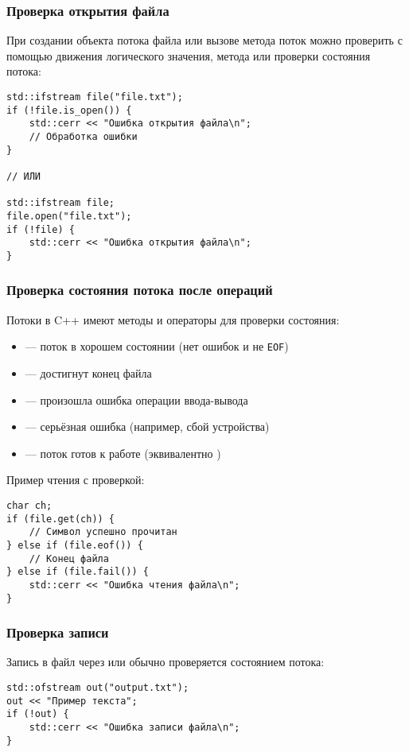 \subsubsection{Проверка открытия файла}
При создании объекта потока файла или вызове метода  поток можно проверить с помощью движения логического
значения, метода  или проверки состояния потока:
\begin{verbatim}
std::ifstream file("file.txt");
if (!file.is_open()) {
    std::cerr << "Ошибка открытия файла\n";
    // Обработка ошибки
}

// ИЛИ

std::ifstream file;
file.open("file.txt");
if (!file) {
    std::cerr << "Ошибка открытия файла\n";
}
\end{verbatim}

\subsubsection{Проверка состояния потока после операций}
Потоки в C++ имеют методы и операторы для проверки состояния:
\begin{itemize}
\item {} — поток в хорошем состоянии (нет ошибок и не \verb|EOF|)
\item {} — достигнут конец файла
\item {} — произошла ошибка операции ввода-вывода
\item {} — серьёзная ошибка (например, сбой устройства)
\item {} — поток готов к работе (эквивалентно )
\end{itemize}
Пример чтения с проверкой:

\begin{verbatim}
char ch;
if (file.get(ch)) {
    // Символ успешно прочитан
} else if (file.eof()) {
    // Конец файла
} else if (file.fail()) {
    std::cerr << "Ошибка чтения файла\n";
}
\end{verbatim}
\subsubsection{Проверка записи}
Запись в файл через  или  обычно проверяется состоянием потока:
\begin{verbatim}
std::ofstream out("output.txt");
out << "Пример текста";
if (!out) {
    std::cerr << "Ошибка записи файла\n";
}
\end{verbatim}


